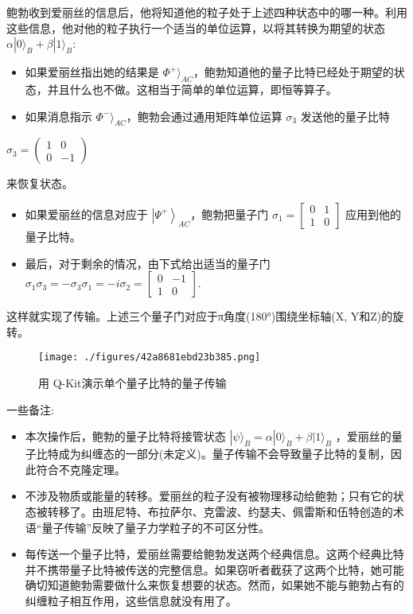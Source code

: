 鲍勃收到爱丽丝的信息后，他将知道他的粒子处于上述四种状态中的哪一种。利用这些信息，他对他的粒子执行一个适当的单位运算，以将其转换为期望的状态 $\alpha|0\rangle_B + \beta|1\rangle_B$:

\begin{itemize}
  \item 如果爱丽丝指出她的结果是 $\Phi^+\rangle_{AC}$，鲍勃知道他的量子比特已经处于期望的状态，并且什么也不做。这相当于简单的单位运算，即恒等算子。
  \item 如果消息指示 $\Phi^-\rangle_{AC}$，鲍勃会通过通用矩阵单位运算 $\sigma_3$ 发送他的量子比特
\end{itemize}

$\sigma_3 = \begin{pmatrix}1 & 0 \\0 & -1\end{pmatrix}$

来恢复状态。

\begin{itemize}
  \item 如果爱丽丝的信息对应于 $\left|\Psi^{+}\right\rangle_{AC}$，鲍勃把量子门
 $\sigma_{1}=\begin{bmatrix}  0 & 1 \\  1 & 0  \end{bmatrix}$
  应用到他的量子比特。
  \item 最后，对于剩余的情况，由下式给出适当的量子门
 $\sigma_{1}\sigma_{3}=-\sigma_{3}\sigma_{1}=-i\sigma_{2}=\begin{bmatrix}  0 & -1 \\  1 & 0  \end{bmatrix}$.
\end{itemize}

这样就实现了传输。上述三个量子门对应于π角度(180°)围绕坐标轴(X, Y和Z)的旋转。

\begin{figure}[ht]
\centering
\texttt{[image: ./figures/42a8681ebd23b385.png]}
\caption{用 Q-Kit演示单个量子比特的量子传输} \label{fig_LZYXCT_4}
\end{figure}

一些备注:

\begin{itemize}
\item 本次操作后，鲍勃的量子比特将接管状态 $|\psi\rangle_B = \alpha|0\rangle_B + \beta|1\rangle_B$ ，爱丽丝的量子比特成为纠缠态的一部分(未定义)。量子传输不会导致量子比特的复制，因此符合不克隆定理。
\item 不涉及物质或能量的转移。爱丽丝的粒子没有被物理移动给鲍勃；只有它的状态被转移了。由班尼特、布拉萨尔、克雷波、约瑟夫、佩雷斯和伍特创造的术语“量子传输”反映了量子力学粒子的不可区分性。
\item 每传送一个量子比特，爱丽丝需要给鲍勃发送两个经典信息。这两个经典比特并不携带量子比特被传送的完整信息。如果窃听者截获了这两个比特，她可能确切知道鲍勃需要做什么来恢复想要的状态。然而，如果她不能与鲍勃占有的纠缠粒子相互作用，这些信息就没有用了。
\end{itemize}

